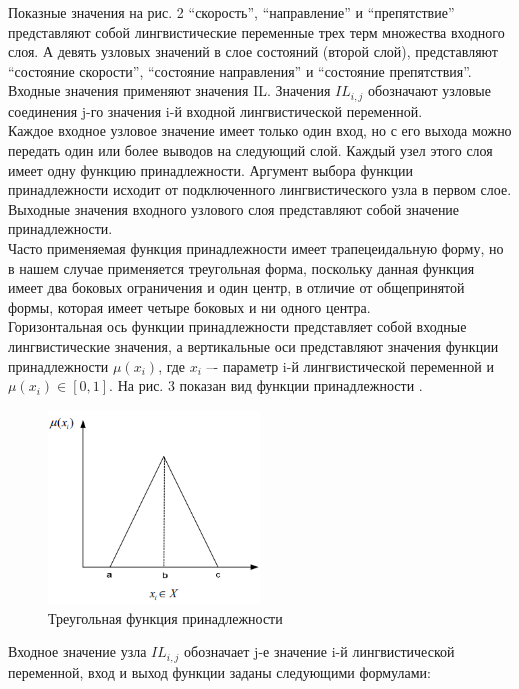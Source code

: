 \documentclass{article}
\begin{document}
  {
  \indent\indent\indent Показные значения на рис. 2 “скорость”, “направление” и “препятствие” представляют собой лингвистические переменные трех 
  терм множества входного слоя. А девять узловых значений в слое состояний (второй слой), представляют “состояние скорости”, 
  “состояние направления” и “состояние препятствия”.\\
  \indent\indent Входные значения применяют значения IL. Значения $IL_{i,j}$ обозначают узловые соединения j-го значения i-й 
  входной лингвистической переменной.\\
  \indent\indent Каждое входное узловое значение имеет только один вход, но с его выхода можно передать один или более выводов на следующий слой. 
  Каждый узел этого слоя имеет одну функцию принадлежности. Аргумент выбора функции принадлежности исходит от подключенного 
  лингвистического узла в первом слое. Выходные значения входного узлового слоя представляют собой значение принадлежности.\\
  \indent\indent Часто применяемая функция принадлежности имеет трапецеидальную форму, но в нашем случае применяется треугольная 
  форма, поскольку данная функция имеет два боковых ограничения и один центр, в отличие от общепринятой формы, которая имеет 
  четыре боковых и ни одного центра.\\
  \indent\indent Горизонтальная ось функции принадлежности представляет собой входные лингвистические значения, 
  а вертикальные оси представляют значения функции принадлежности $\mu(x_i)$, где $x_i$ –- параметр i-й лингвистической 
  переменной и $\mu(x_i) \in [0,1]$. На рис. 3 показан вид функции принадлежности \cite{finaev2005modeli}.
  }
  \begin{figure} [H]
    \centering
    \includegraphics[width=0.5\textwidth]{Figures/pic_3.png}
    \caption{\label{fig:chart}Треугольная функция принадлежности}
  \end{figure}
  {
    \indent\indent\indent Входное значение узла $IL_{i,j}$ обозначает j-е значение i-й лингвистической переменной, вход и выход функции 
    заданы следующими формулами:\\
  }
\end{document}
